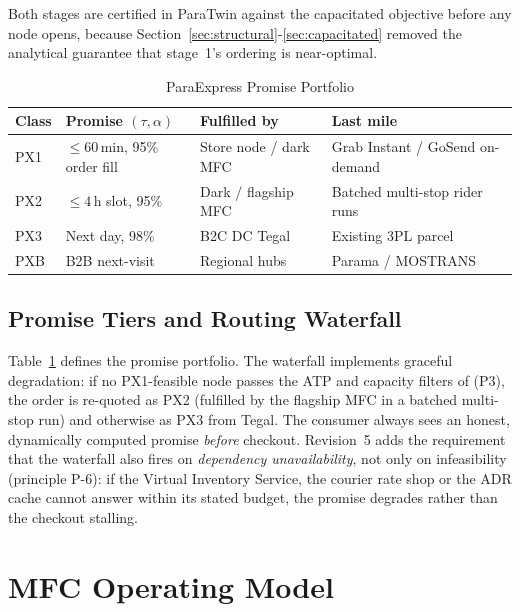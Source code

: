 \documentclass[10pt,twocolumn,letterpaper]{article}
\theoremstyle{definition}
\begin{document}
Both stages are certified in ParaTwin against the capacitated objective before any node opens, because Section~\ref{sec:structural}-\ref{sec:capacitated} removed the analytical guarantee that stage~1's ordering is near-optimal.

\begin{table}[t]
\caption{ParaExpress Promise Portfolio}
\label{tab:promise}
\centering\footnotesize
\begin{tabular}{@{}lp{1.55cm}p{1.5cm}p{2.0cm}@{}}
\toprule
\textbf{Class} & \textbf{Promise $(\tau,\alpha)$} & \textbf{Fulfilled by} & \textbf{Last mile}\\
\midrule
PX1 & $\le60$\,min, 95\% order fill & Store node / dark MFC & Grab Instant / GoSend on-demand\\
PX2 & $\le4$\,h slot, 95\% & Dark / flagship MFC & Batched multi-stop rider runs\\
PX3 & Next day, 98\% & B2C DC Tegal & Existing 3PL parcel\\
PXB & B2B next-visit & Regional hubs & Parama / MOSTRANS\\
\bottomrule
\end{tabular}
\end{table}

\subsection{Promise Tiers and Routing Waterfall}
Table~\ref{tab:promise} defines the promise portfolio. The waterfall implements graceful degradation: if no PX1-feasible node passes the ATP and capacity filters of (P3), the order is re-quoted as PX2 (fulfilled by the flagship MFC in a batched multi-stop run) and otherwise as PX3 from Tegal. The consumer always sees an honest, dynamically computed promise \emph{before} checkout. Revision~5 adds the requirement that the waterfall also fires on \emph{dependency unavailability}, not only on infeasibility (principle P-6): if the Virtual Inventory Service, the courier rate shop or the ADR cache cannot answer within its stated budget, the promise degrades rather than the checkout stalling.

\section{MFC Operating Model}\label{sec:mfc}
\end{document}
